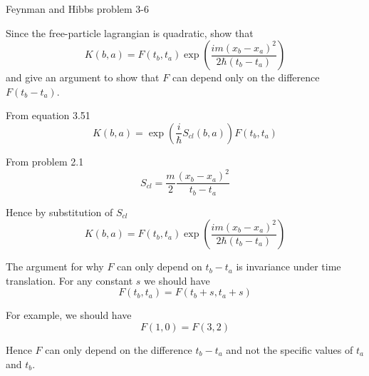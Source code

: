 \documentclass[12pt]{article}
\begin{document}
\noindent
Feynman and Hibbs problem 3-6

\bigskip
\noindent
Since the free-particle lagrangian is quadratic, show that
\begin{equation*}
K(b,a)=F(t_b,t_a)\exp\left(\frac{im(x_b-x_a)^2}{2\hbar(t_b-t_a)}\right)
\end{equation*}
and give an argument to show that $F$ can depend only on the difference $F(t_b-t_a)$.

\bigskip
\noindent
From equation 3.51
\begin{equation*}
K(b,a)=\exp\left(\frac{i}{\hbar}S_{cl}(b,a)\right)F(t_b,t_a)
\end{equation*}

\noindent
From problem 2.1
\begin{equation*}
S_{cl}=\frac{m}{2}\frac{(x_b-x_a)^2}{t_b-t_a}
\end{equation*}

\noindent
Hence by substitution of $S_{cl}$
\begin{equation*}
K(b,a)=F(t_b,t_a)\exp\left(\frac{im(x_b-x_a)^2}{2\hbar(t_b-t_a)}\right)
\end{equation*}

\noindent
The argument for why $F$ can only depend on $t_b-t_a$ is invariance under time translation.
For any constant $s$ we should have
\begin{equation*}
F(t_b,t_a)=F(t_b+s,t_a+s)
\end{equation*}

\noindent
For example, we should have
\begin{equation*}
F(1,0)=F(3,2)
\end{equation*}

\noindent
Hence $F$ can only depend on the difference $t_b-t_a$ and not the specific values of $t_a$ and $t_b$.
\end{document}

